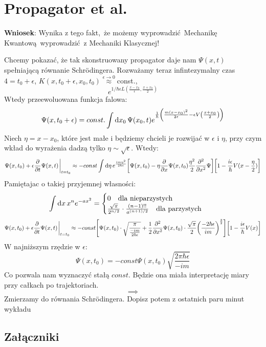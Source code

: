 \documentclass[12pt,a4paper]{report}
\newcommand{\com}[1]{{\color{red} #1}}
\renewcommand{\emph}{\textbf}
\newenvironment{lecture}[1]{\par\medskip
   \noindent\chapter{#1} \rmfamily}{\medskip}
\begin{document}
\begin{lecture}{Propagator et al.}
\emph{Wniosek}: Wynika z tego fakt, że możemy wyprowadzić Mechanikę Kwantową wyprowadzić z Mechaniki Klasycznej!

Chcemy pokazać, że tak skonstruowany propagator daje nam $\Psi(x, t)$ spełniającą równanie Schrödingera. Rozważamy teraz infintezymalny czas $4 = t_0 + \epsilon$, $K(x, t_0+\epsilon, x_0, t_0) \stackrel{\epsilon \to 0}{\approx} $const., $$e^{1/\hbar \epsilon L(\frac{x - x_0}{\epsilon}, \frac{x+x_0}{2})}$$
Wtedy przeewoluowana funkcja falowa:
\[
    \Psi(x, t_0+\epsilon) = const. \int \dd{x_0} \Psi(x_0, t)e^{\frac{1}{\hbar} \qty(\frac{m(x - x_0)^2}{2\epsilon} - \epsilon V\qty(\frac{x+x_0}{2}))}
\]
Niech $\eta = x- x_0$, które jest małe i będziemy chcieli je rozwijać w $\epsilon$ i $\eta$, przy czym wkład do wyrażenia dadzą tylko $\eta \sim \sqrt{\epsilon}$. Wtedy:
\[
    \Psi(x, t_0) + \epsilon \pdv{t} \Psi(x, t)\eval_{t = t_0} \approx -const \int \dd{\eta} e^{\frac{i m \eta^2}{2 \hbar \epsilon}} \qty[\Psi(x, t_0) - \eta \pdv{x} \Psi(x, t_0) \frac{\eta^2}{2} \pdv[2]{x}\Psi] \qty[1 - \frac{i \epsilon}{\hbar} V(x - \frac{\eta}{2})]
\]
Pamiętajac o takiej przyjemnej własności:
\color{BrickRed}
\[ \int \dd{x} x^n e^{-ax^2} = \begin{cases}
    0\qq{dla nieparzystych}\\
    \frac{\sqrt{\pi}}{2^{n/2}} \cdot \frac{(n-1)!!}{a^{(n+1)/2}}\qq{dla parzystych}
\end{cases}
\]
\color{black}
\[
    \Psi(x, t_0) + \epsilon \pdv{t} \Psi(x, t)\eval_{t = t_0} \approx -const \qty[\Psi(x, t_0)\cdot \sqrt{\frac{\pi}{\frac{-im}{2 \hbar \epsilon}}} + \frac12 \pdv[2]{x} \Psi(x, t_0) \cdot \frac{\sqrt{\pi}}{2}\qty(\frac{-2\hbar\epsilon}{i m})^{\frac32}]\qty[1 - \frac{i \epsilon}{\hbar} V(x)]
\]
W najniższym rzędzie w $\epsilon$:
\[
    \Psi(x, t_0) = - const \Psi(x, t_0) \sqrt{\frac{2 \pi \hbar \epsilon}{- i m}}
\]
Co pozwala nam wyznaczyć stałą $const$. Będzie ona miała interpretację miary przy całkach po trajektoriach. 
\[
    \implies 
\]
Zmierzamy do równania Schrödingera. \com{Dopisz potem z ostatnich paru minut wykładu}
\end{lecture}


\tableofcontents

\listoffigures

\printindex

\begin{center}
    \chapter*{Załączniki}
\end{center}
\end{document}

